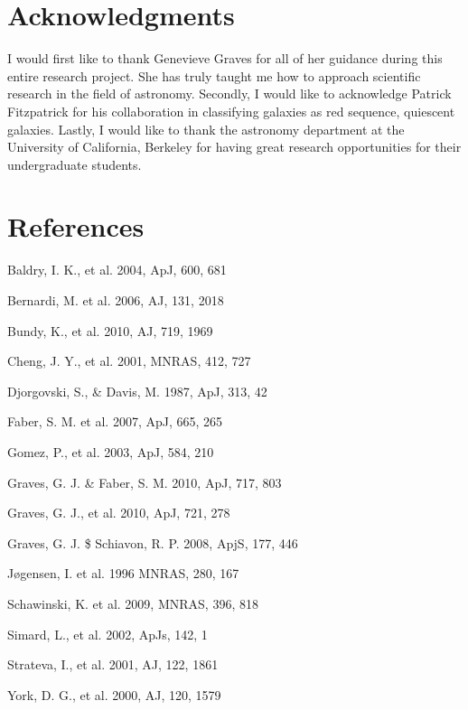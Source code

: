 \documentclass[showcase, preprintnumbers, amsmath, amssymb, bibnotes, 12pt]{revtex4}
\begin{document}
\section{Acknowledgments}

I would first like to thank Genevieve Graves for all of her guidance during this entire research project. She has truly taught me how to approach scientific research in the field of astronomy. Secondly, I would like to acknowledge Patrick Fitzpatrick for his collaboration in classifying galaxies as red sequence, quiescent galaxies. Lastly, I would like to thank the astronomy department at the University of California, Berkeley for having great research opportunities for their undergraduate students.

\section{References}

Baldry, I. K., et al. 2004, ApJ, 600, 681

Bernardi, M. et al. 2006, AJ, 131, 2018

Bundy, K., et al. 2010, AJ, 719, 1969

Cheng, J. Y., et al. 2001, MNRAS, 412, 727

Djorgovski, S., \& Davis, M. 1987, ApJ, 313, 42

Faber, S. M. et al. 2007, ApJ, 665, 265

Gomez, P., et al. 2003, ApJ, 584, 210

Graves, G. J. \& Faber, S. M. 2010, ApJ, 717, 803

Graves, G. J., et al. 2010, ApJ, 721, 278

Graves, G. J. \$ Schiavon, R. P. 2008, ApjS, 177, 446

J\o gensen, I. et al. 1996 MNRAS, 280, 167

Schawinski, K. et al. 2009, MNRAS, 396, 818

Simard, L., et al. 2002, ApJs, 142, 1

Strateva, I., et al. 2001, AJ, 122, 1861

York, D. G., et al. 2000, AJ, 120, 1579
\end{document}

